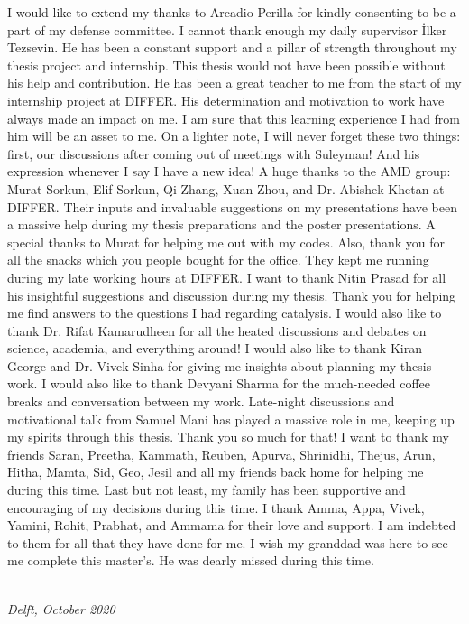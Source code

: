 I would like to extend my thanks to Arcadio Perilla for kindly consenting to be a part of my defense committee.
I cannot thank enough my daily supervisor İlker Tezsevin. He has been a constant support and a pillar of strength throughout my thesis project and internship. This thesis would not have been possible without his help and contribution. He has been a great teacher to me from the start of my internship project at DIFFER. His determination and motivation to work have always made an impact on me. I am sure that this learning experience I had from him will be an asset to me. On a lighter note, I will never forget these two things: first, our discussions after coming out of meetings with Suleyman! And his expression whenever I say I have a new idea!
A huge thanks to the AMD group: Murat Sorkun, Elif Sorkun, Qi Zhang, Xuan Zhou, and Dr. Abishek Khetan at DIFFER. Their inputs and invaluable suggestions on my presentations have been a massive help during my thesis preparations and the poster presentations. A special thanks to Murat for helping me out with my codes. Also, thank you for all the snacks which you people bought for the office. They kept me running during my late working hours at DIFFER.
I want to thank Nitin Prasad for all his insightful suggestions and discussion during my thesis. Thank you for helping me find answers to the questions I had regarding catalysis. I would also like to thank Dr. Rifat Kamarudheen for all the heated discussions and debates on science, academia, and everything around! I would also like to thank Kiran George and Dr. Vivek Sinha for giving me insights about planning my thesis work. I would also like to thank Devyani Sharma for the much-needed coffee breaks and conversation between my work. Late-night discussions and motivational talk from Samuel Mani has played a massive role in me, keeping up my spirits through this thesis. Thank you so much for that! I want to thank my friends Saran, Preetha, Kammath, Reuben, Apurva, Shrinidhi, Thejus, Arun, Hitha, Mamta, Sid, Geo, Jesil and all my friends back home for helping me during this time.
Last but not least, my family has been supportive and encouraging of my decisions during this time. I thank Amma, Appa, Vivek, Yamini, Rohit, Prabhat, and Ammama for their love and support. I am indebted to them for all that they have done for me. I wish my granddad was here to see me complete this master's. He was dearly missed during this time.

\begin{flushright}
{\makeatletter\itshape
    \@author \\
    Delft, October 2020
\makeatother}
\end{flushright}





 




